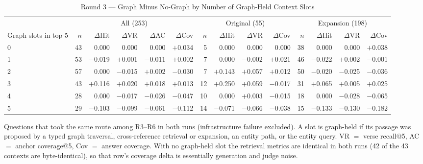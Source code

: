 \begin{table}[!t]
\caption{Round 3 --- Graph Minus No-Graph by Number of Graph-Held
Context Slots}
\label{tab:round3slots}
\centering
\begin{threeparttable}
\footnotesize
\begin{tabular}{@{}lrrrrrrrrrrrrr@{}}
\toprule
& \multicolumn{5}{c}{All (253)} & \multicolumn{4}{c}{Original (55)}
& \multicolumn{4}{c}{Expansion (198)} \\
\cmidrule(lr){2-6}\cmidrule(lr){7-10}\cmidrule(lr){11-14}
Graph slots in top-5 & $n$ & $\Delta$Hit & $\Delta$VR & $\Delta$AC &
$\Delta$Cov & $n$ & $\Delta$Hit & $\Delta$VR & $\Delta$Cov & $n$ &
$\Delta$Hit & $\Delta$VR & $\Delta$Cov \\
\midrule
0 & 43 & 0.000 & 0.000 & 0.000 & $+$0.034 & 5 & 0.000 & 0.000 & 0.000 & 38 & 0.000 & 0.000 & $+$0.038 \\
1 & 53 & $-$0.019 & $+$0.001 & $-$0.011 & $+$0.002 & 7 & 0.000 & $-$0.002 & $+$0.021 & 46 & $-$0.022 & $+$0.002 & $-$0.001 \\
2 & 57 & 0.000 & $-$0.015 & $+$0.002 & $-$0.030 & 7 & $+$0.143 & $+$0.057 & $+$0.012 & 50 & $-$0.020 & $-$0.025 & $-$0.036 \\
3 & 43 & $+$0.116 & $+$0.020 & $+$0.018 & $+$0.013 & 12 & $+$0.250 & $+$0.059 & $-$0.017 & 31 & $+$0.065 & $+$0.005 & $+$0.025 \\
4 & 28 & 0.000 & $-$0.017 & $-$0.026 & $-$0.047 & 10 & 0.000 & $+$0.003 & $-$0.015 & 18 & 0.000 & $-$0.028 & $-$0.065 \\
5 & 29 & $-$0.103 & $-$0.099 & $-$0.061 & $-$0.112 & 14 & $-$0.071 & $-$0.066 & $-$0.038 & 15 & $-$0.133 & $-$0.130 & $-$0.182 \\
\bottomrule
\end{tabular}
\begin{tablenotes}\footnotesize
\item Questions that took the same route among R3--R6 in both runs
(infrastructure failure excluded). A slot is graph-held if its passage
was proposed by a typed graph traversal, cross-reference retrieval or
expansion, an entity path, or the entity query. VR $=$ verse recall@5,
AC $=$ anchor coverage@5, Cov $=$ answer coverage. With no graph-held
slot the retrieval metrics are identical in both runs (42 of the 43
contexts are byte-identical), so that row's coverage delta is
essentially generation and judge noise.
\end{tablenotes}
\end{threeparttable}
\end{table}

